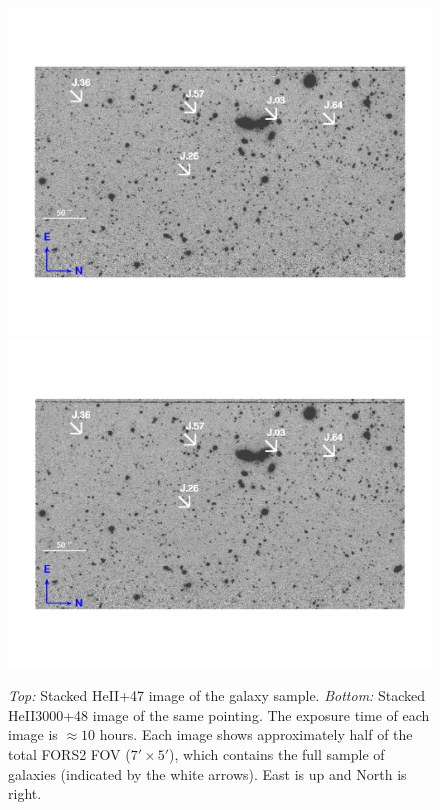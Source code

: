 \documentclass[trackchanges,twocolumn]{aastex62}
\begin{document}
\begin{figure}[ht!]
\centering
\includegraphics[scale=.61]{figure4a.pdf}
\includegraphics[scale=.61]{figure4b.pdf}
\caption{\emph{Top:} Stacked HeII+47 image of the galaxy sample. \emph{Bottom:} Stacked HeII3000+48 image of the same pointing. The exposure time of each image is $\approx 10$ hours. Each image shows approximately half of the total FORS2 FOV ($7' \times 5'$), which contains the full sample of galaxies (indicated by the white arrows). East is up and North is right.
\label{fig:stacked_image}}
\end{figure}
\end{document}
